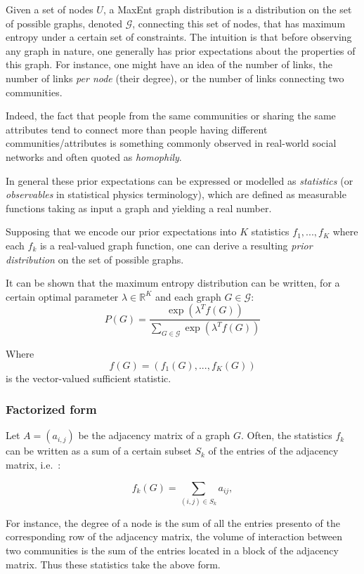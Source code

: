 Given a set of nodes \(U\), a MaxEnt graph distribution is a
distribution on the set of possible graphs, denoted \(\mathcal{G}\),
connecting this set of nodes, that has maximum entropy under a certain
set of constraints. The intuition is that before observing any graph in
nature, one generally has prior expectations about the properties of
this graph. For instance, one might have an idea of the number of links,
the number of links \emph{per node} (their degree), or the number of
links connecting two communities.

Indeed, the fact that people from the same communities or sharing the
same attributes tend to connect more than people having different
communities/attributes is something commonly observed in real-world
social networks and often quoted as \emph{homophily}.

In general these prior expectations can be expressed or modelled as
\emph{statistics} (or \emph{observables} in statistical physics
terminology), which are defined as measurable functions taking as input
a graph and yielding a real number.

Supposing that we encode our prior expectations into \(K\) statistics
\(f_1,...,f_K\) where each \(f_k\) is a real-valued graph function, one
can derive a resulting \emph{prior distribution} on the set of possible
graphs.

It can be shown that the maximum entropy distribution can be written,
for a certain optimal parameter \(\lambda \in \mathbb{R}^K\) and each
graph \(G\in \mathcal{G}\): \[
P(G) = 
\frac{
  \exp(\lambda^T f(G))
  }{
    \sum_{G \in \mathcal{G}}\exp(\lambda^T f(G))
    }
\]

Where \[f(G)=(f_1(G), ..., f_K(G))\] is the vector-valued sufficient
statistic.

\hypertarget{factorized-form}{%
\subsubsection{Factorized form}\label{factorized-form}}

Let \(A = (a_{i,j})\) be the adjacency matrix of a graph \(G\). Often,
the statistics \(f_k\) can be written as a sum of a certain subset
\(S_{k}\) of the entries of the adjacency matrix, i.e.~:

\[f_k(G)= \sum\limits_{(i,j)\in S_k} a_{ij},\]

For instance, the degree of a node is the sum of all the entries
presento of the corresponding row of the adjacency matrix, the volume of
interaction between two communities is the sum of the entries located in
a block of the adjacency matrix. Thus these statistics take the above
form.

